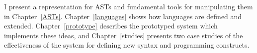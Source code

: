 
I present a representation for ASTs and fundamental tools for manipulating them in Chapter~\ref{ASTs}. Chapter~\ref{languages} shows how languages are defined and extended. Chapter~\ref{prototype} describes the prototyped system which implements these ideas, and Chapter~\ref{studies} presents two case studies of the effectiveness of the system for defining new syntax and programming constructs. 


